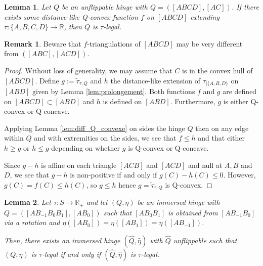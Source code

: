 \documentclass[a4paper,12pt]{article}
\def\RR{\mathbb{R}}
\newcommand{\tautilde}[2]{\widetilde\tau_{#1,#2}}
\newtheorem{lem}{Lemma}[section]		 %
\theoremstyle{definition}
\newtheorem*{rem}{Remark}			 %
\begin{document}
						\begin{lem} \label{lem:arrete_ext}
							Let $Q$ be an unflippable hinge with $Q=([ABCD],[AC])$.
							If there exists some distance-like Q-convex function $f$ on $[ABCD]$ extending $\tau: \{A,B,C,D\} \rightarrow \RR$, then $Q$ is $\tau$-legal.
						\end{lem}
						\begin{rem}\label{rem:beware_triangulations_may_very} Beware that $f$-triangulations of $[ABCD]$ may be very different from $([ABC],[ACD])$. 
						 
						\end{rem}

						
						\begin{proof}
							Without loss of generality, we may assume that $C$ is in the convex hull of 
							$[ABCD]$.
							Define $g:=\tautilde{\tau}{Q}$ and $h$ the 
							distance-like extension of $\tau_{|\{A,B,D\}}$ on $[ABD]$ given by Lemma \ref{lem:prolongement}.
							Both functions $f$ and $g$ are defined on $[ABCD]\subset [ABD]$ and $h$ is defined on $[ABD]$. Furthermore, $g$ is either Q-convex or Q-concave.
							
							Applying Lemma \ref{lem:diff_Q_convexe} on sides the hinge $Q$ then on any edge within $Q$ and with extremities on the sides, we see that $f\leq h$ and that either $h\geq g$ or $h\leq g$ depending on whether $g$ is  Q-convex or Q-concave.

							Since $g-h$ is affine on each triangle $[ACB]$ and $[ACD]$ and null at $A,B$ and $D$, we see that
							$g-h$ is non-positive	if and only if $g(C)-h(C)\leq 0$.
							However, $g(C)=f(C)\leq h(C)$, so $g\leq h$ hence $g=\tautilde{\tau}{Q}$ is Q-convex.
						\end{proof}
						\begin{lem} \label{lem:arrete_deg} Let $\tau:S\rightarrow \RR_+$ and 
						 let $(Q,\eta)$ be an immersed hinge with $Q=([AB_{-1}B_0B_{1}],[AB_0])$ such that $[AB_0B_{1}]$ is obtained from $[AB_{-1}B_0]$ via a rotation and $\eta([AB_0])=\eta([AB_1])=\eta([AB_{-1}])$.
						 
						Then, there exists an immersed hinge $(\hat Q,\hat\eta)$ with $\hat Q$ unflippable such that 
						$(Q,\eta)$ is $\tau$-legal if and only if $(\hat Q,\hat\eta)$ is $\tau$-legal.				
						\end{lem}
\end{document}
